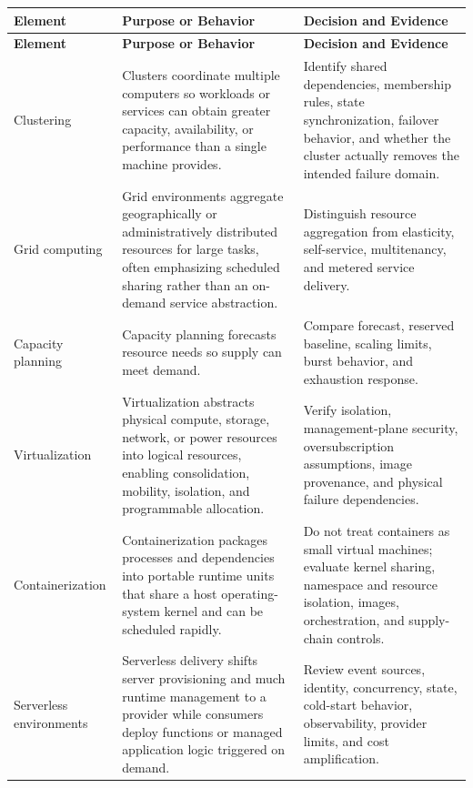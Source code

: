 \documentclass[11pt]{article}
\begin{document}
\begin{longtable}{@{}>{\RaggedRight\arraybackslash}p{}>{\RaggedRight\arraybackslash}p{}>{\RaggedRight\arraybackslash}p{}@{}}
\toprule\rowcolor{Navy}\color{white}\textbf{Element} & \color{white}\textbf{Purpose or Behavior} & \color{white}\textbf{Decision and Evidence}\\\midrule\endfirsthead
\toprule\rowcolor{Navy}\color{white}\textbf{Element} & \color{white}\textbf{Purpose or Behavior} & \color{white}\textbf{Decision and Evidence}\\\midrule\endhead
Clustering & Clusters coordinate multiple computers so workloads or services can obtain greater capacity, availability, or performance than a single machine provides. & Identify shared dependencies, membership rules, state synchronization, failover behavior, and whether the cluster actually removes the intended failure domain. \\\midrule
Grid computing & Grid environments aggregate geographically or administratively distributed resources for large tasks, often emphasizing scheduled sharing rather than an on-demand service abstraction. & Distinguish resource aggregation from elasticity, self-service, multitenancy, and metered service delivery. \\\midrule
Capacity planning & Capacity planning forecasts resource needs so supply can meet demand. & Compare forecast, reserved baseline, scaling limits, burst behavior, and exhaustion response. \\\midrule
Virtualization & Virtualization abstracts physical compute, storage, network, or power resources into logical resources, enabling consolidation, mobility, isolation, and programmable allocation. & Verify isolation, management-plane security, oversubscription assumptions, image provenance, and physical failure dependencies. \\\midrule
Containerization & Containerization packages processes and dependencies into portable runtime units that share a host operating-system kernel and can be scheduled rapidly. & Do not treat containers as small virtual machines; evaluate kernel sharing, namespace and resource isolation, images, orchestration, and supply-chain controls. \\\midrule
Serverless environments & Serverless delivery shifts server provisioning and much runtime management to a provider while consumers deploy functions or managed application logic triggered on demand. & Review event sources, identity, concurrency, state, cold-start behavior, observability, provider limits, and cost amplification. \\\midrule

\end{longtable}
\end{document}
